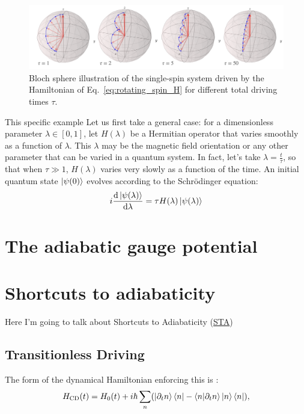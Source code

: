     \begin{figure}[h]
    \centering
    \includegraphics[width=0.9\linewidth]{images/magnetic_field_spin.png} \caption{Bloch sphere illustration of the single-spin system driven by the Hamiltonian of Eq.~\eqref{eq:rotating_spin_H} for different total driving times $\tau$.}\label{fig:bloch_rotating_spin}
    \end{figure}
    
    This specific example Let us first take a general case: for a dimensionless parameter $\lambda \in [0,1]$, let $H(\lambda)$ be a Hermitian operator that varies smoothly as a function of $\lambda$. This $\lambda$ may be the magnetic field orientation or any other parameter that can be varied in a quantum system. In fact, let's take $\lambda = \frac{t}{\tau}$, so that when $\tau \gg 1$, $H(\lambda)$ varies very slowly as a function of the time.  An initial quantum state $\ket{\psi(0)}$ evolves according to the Schr\"{o}dinger equation:
    \begin{equation}\label{eq:adiabatic_schrodinger}
        i\dv{\ket{\psi(\lambda)}}{\lambda} = \tau H(\lambda)\ket{\psi(\lambda)}
    \end{equation}
    
    \section{The adiabatic gauge potential}

    \section{Shortcuts to adiabaticity}
    
    Here I'm going to talk about Shortcuts to Adiabaticity (\hyperref[acr:sta]{STA})
    
    \subsection{Transitionless Driving}
    The form of the dynamical Hamiltonian enforcing this is \cite{berry_transitionless_2009}:
    \begin{equation}\label{eq:counterdiabatic}
        H_{\mathrm{CD}}(t) = H_0 (t) + i\hbar \sum_n (\ket{\partial_t n}\bra{n} - \bra{n}\ket{\partial_t n}\ket{n}\bra{n}),
    \end{equation}
